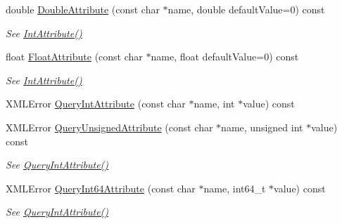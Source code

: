 \begin{DoxyCompactItemize}
double \mbox{\hyperlink{classtinyxml2_1_1_x_m_l_element_a10a90c505aea716bf073eea1c97f33b5}{Double\+Attribute}} (const char $\ast$name, double default\+Value=0) const
\begin{DoxyCompactList}\small\item\em See \mbox{\hyperlink{classtinyxml2_1_1_x_m_l_element_a95a89b13bb14a2d4655e2b5b406c00d4}{Int\+Attribute()}} \end{DoxyCompactList}\item 
\mbox{\label{classtinyxml2_1_1_x_m_l_element_ab1f4be2332e27dc640e9b6abd01d64dd}} 
float \mbox{\hyperlink{classtinyxml2_1_1_x_m_l_element_ab1f4be2332e27dc640e9b6abd01d64dd}{Float\+Attribute}} (const char $\ast$name, float default\+Value=0) const
\begin{DoxyCompactList}\small\item\em See \mbox{\hyperlink{classtinyxml2_1_1_x_m_l_element_a95a89b13bb14a2d4655e2b5b406c00d4}{Int\+Attribute()}} \end{DoxyCompactList}\item 
X\+M\+L\+Error \mbox{\hyperlink{classtinyxml2_1_1_x_m_l_element_a8a78bc1187c1c45ad89f2690eab567b1}{Query\+Int\+Attribute}} (const char $\ast$name, int $\ast$value) const
\item 
\mbox{\label{classtinyxml2_1_1_x_m_l_element_a26fc84cbfba6769dafcfbf256c05e22f}} 
X\+M\+L\+Error \mbox{\hyperlink{classtinyxml2_1_1_x_m_l_element_a26fc84cbfba6769dafcfbf256c05e22f}{Query\+Unsigned\+Attribute}} (const char $\ast$name, unsigned int $\ast$value) const
\begin{DoxyCompactList}\small\item\em See \mbox{\hyperlink{classtinyxml2_1_1_x_m_l_element_a8a78bc1187c1c45ad89f2690eab567b1}{Query\+Int\+Attribute()}} \end{DoxyCompactList}\item 
\mbox{\label{classtinyxml2_1_1_x_m_l_element_a7c0955d80b6f8d196744eacb0f6e90a8}} 
X\+M\+L\+Error \mbox{\hyperlink{classtinyxml2_1_1_x_m_l_element_a7c0955d80b6f8d196744eacb0f6e90a8}{Query\+Int64\+Attribute}} (const char $\ast$name, int64\+\_\+t $\ast$value) const
\begin{DoxyCompactList}\small\item\em See \mbox{\hyperlink{classtinyxml2_1_1_x_m_l_element_a8a78bc1187c1c45ad89f2690eab567b1}{Query\+Int\+Attribute()}} \end{DoxyCompactList}\item 

\end{DoxyCompactItemize}
